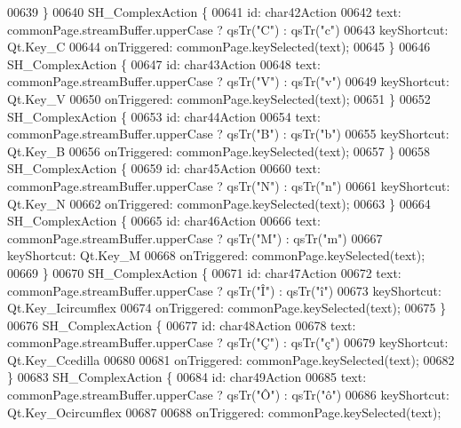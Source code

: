 \begin{DoxyCode}
00639     \}
00640     SH\_ComplexAction \{
00641         \textcolor{keywordtype}{id}: char42Action
00642         text: commonPage.streamBuffer.upperCase ? qsTr(\textcolor{stringliteral}{"C"}) : qsTr(\textcolor{stringliteral}{"c"})
00643         keyShortcut: Qt.Key\_C
00644         onTriggered: commonPage.keySelected(text);
00645     \}
00646     SH\_ComplexAction \{
00647         \textcolor{keywordtype}{id}: char43Action
00648         text: commonPage.streamBuffer.upperCase ? qsTr(\textcolor{stringliteral}{"V"}) : qsTr(\textcolor{stringliteral}{"v"})
00649         keyShortcut: Qt.Key\_V
00650         onTriggered: commonPage.keySelected(text);
00651     \}
00652     SH\_ComplexAction \{
00653         \textcolor{keywordtype}{id}: char44Action
00654         text: commonPage.streamBuffer.upperCase ? qsTr(\textcolor{stringliteral}{"B"}) : qsTr(\textcolor{stringliteral}{"b"})
00655         keyShortcut: Qt.Key\_B
00656         onTriggered: commonPage.keySelected(text);
00657     \}
00658     SH\_ComplexAction \{
00659         \textcolor{keywordtype}{id}: char45Action
00660         text: commonPage.streamBuffer.upperCase ? qsTr(\textcolor{stringliteral}{"N"}) : qsTr(\textcolor{stringliteral}{"n"})
00661         keyShortcut: Qt.Key\_N
00662         onTriggered: commonPage.keySelected(text);
00663     \}
00664     SH\_ComplexAction \{
00665         \textcolor{keywordtype}{id}: char46Action
00666         text: commonPage.streamBuffer.upperCase ? qsTr(\textcolor{stringliteral}{"M"}) : qsTr(\textcolor{stringliteral}{"m"})
00667         keyShortcut: Qt.Key\_M
00668         onTriggered: commonPage.keySelected(text);
00669     \}
00670     SH\_ComplexAction \{
00671         \textcolor{keywordtype}{id}: char47Action
00672         text: commonPage.streamBuffer.upperCase ? qsTr(\textcolor{stringliteral}{"Î"}) : qsTr(\textcolor{stringliteral}{"î"})
00673         keyShortcut: Qt.Key\_Icircumflex
00674         onTriggered: commonPage.keySelected(text);
00675     \}
00676     SH\_ComplexAction \{
00677         \textcolor{keywordtype}{id}: char48Action
00678         text: commonPage.streamBuffer.upperCase ? qsTr(\textcolor{stringliteral}{"Ç"}) : qsTr(\textcolor{stringliteral}{"ç"})
00679         keyShortcut: Qt.Key\_Ccedilla
00680 
00681         onTriggered: commonPage.keySelected(text);
00682     \}
00683     SH\_ComplexAction \{
00684         \textcolor{keywordtype}{id}: char49Action
00685         text: commonPage.streamBuffer.upperCase ? qsTr(\textcolor{stringliteral}{"Ô"}) : qsTr(\textcolor{stringliteral}{"ô"})
00686         keyShortcut: Qt.Key\_Ocircumflex
00687 
00688         onTriggered: commonPage.keySelected(text);

\end{DoxyCode}
